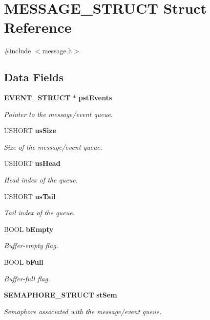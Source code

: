 \section{MESSAGE\_\-STRUCT Struct Reference}
\label{struct_m_e_s_s_a_g_e___s_t_r_u_c_t}


{\ttfamily \#include $<$message.h$>$}\subsection*{Data Fields}
\begin{DoxyCompactItemize}
\item 
{\bf EVENT\_\-STRUCT} $\ast$ {\bf pstEvents}
\begin{DoxyCompactList}\small\item\em Pointer to the message/event queue. \item\end{DoxyCompactList}\item 
USHORT {\bf usSize}
\begin{DoxyCompactList}\small\item\em Size of the message/event queue. \item\end{DoxyCompactList}\item 
USHORT {\bf usHead}
\begin{DoxyCompactList}\small\item\em Head index of the queue. \item\end{DoxyCompactList}\item 
USHORT {\bf usTail}
\begin{DoxyCompactList}\small\item\em Tail index of the queue. \item\end{DoxyCompactList}\item 
BOOL {\bf bEmpty}
\begin{DoxyCompactList}\small\item\em Buffer-\/empty flag. \item\end{DoxyCompactList}\item 
BOOL {\bf bFull}
\begin{DoxyCompactList}\small\item\em Buffer-\/full flag. \item\end{DoxyCompactList}\item 
{\bf SEMAPHORE\_\-STRUCT} {\bf stSem}
\begin{DoxyCompactList}\small\item\em Semaphore associated with the message/event queue. \item\end{DoxyCompactList}\end{DoxyCompactItemize}


